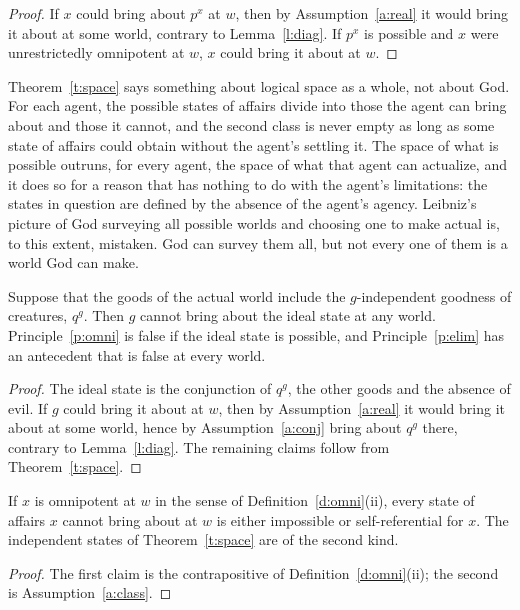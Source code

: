 \documentclass{situationist-preprint}
\begin{document}
\begin{proof}
If $x$ could bring about $p^{x}$ at $w$, then by Assumption~\ref{a:real} it would bring it about at some world, contrary to Lemma~\ref{l:diag}. If $p^{x}$ is possible and $x$ were unrestrictedly omnipotent at $w$, $x$ could bring it about at $w$.
\end{proof}

Theorem~\ref{t:space} says something about logical space as a whole, not about God. For each agent, the possible states of affairs divide into those the agent can bring about and those it cannot, and the second class is never empty as long as some state of affairs could obtain without the agent's settling it. The space of what is possible outruns, for every agent, the space of what that agent can actualize, and it does so for a reason that has nothing to do with the agent's limitations: the states in question are defined by the absence of the agent's agency. Leibniz's picture of God surveying all possible worlds and choosing one to make actual is, to this extent, mistaken. God can survey them all, but not every one of them is a world God can make.

\begin{corollary}\label{c:ideal}
Suppose that the goods of the actual world include the $g$-independent goodness of creatures, $q^{g}$. Then $g$ cannot bring about the ideal state at any world. Principle~\ref{p:omni} is false if the ideal state is possible, and Principle~\ref{p:elim} has an antecedent that is false at every world.
\end{corollary}

\begin{proof}
The ideal state is the conjunction of $q^{g}$, the other goods and the absence of evil. If $g$ could bring it about at $w$, then by Assumption~\ref{a:real} it would bring it about at some world, hence by Assumption~\ref{a:conj} bring about $q^{g}$ there, contrary to Lemma~\ref{l:diag}. The remaining claims follow from Theorem~\ref{t:space}.
\end{proof}

\begin{proposition}\label{p:strat}
If $x$ is omnipotent at $w$ in the sense of Definition~\ref{d:omni}(ii), every state of affairs $x$ cannot bring about at $w$ is either impossible or self-referential for $x$. The independent states of Theorem~\ref{t:space} are of the second kind.
\end{proposition}

\begin{proof}
The first claim is the contrapositive of Definition~\ref{d:omni}(ii); the second is Assumption~\ref{a:class}.
\end{proof}
\end{document}
